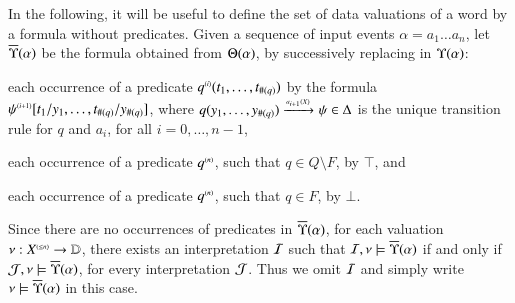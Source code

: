 \documentclass{llncs}
\begin{document}
In the following, it will be useful to define the set of data
valuations of a word by a formula without predicates. Given a sequence
of input events $\alpha = a_1 \ldots a_n$, let $\overline{\Upsilon}({\alpha})$ be
the formula obtained from $\Theta({\alpha})$, by successively
replacing in $\Upsilon({\alpha})$: \begin{compactenum}[(a)]
\item\label{it1:substform} each occurrence of a predicate
  ${q}^{\scriptscriptstyle{({i})}}(t_1,\ldots,t_{\#(q)})$ by the formula
  ${\psi}^{\scriptscriptstyle{({i+1})}}[t_1/y_1,\ldots,t_{\#(q)}/y_{\#(q)}]$, where
  $q(y_1,\ldots,y_{\#(q)}) \xrightarrow{{\scriptscriptstyle a_{i+1}(X)}}_{{\scriptstyle }} \psi \in \Delta$ is
  the unique transition rule for $q$ and $a_i$, for all
  $i=0,\ldots,n-1$,
%
\item\label{it2:substform} each occurrence of a predicate
  ${q}^{\scriptscriptstyle{({n})}}$, such that $q \in Q \setminus F$, by $\top$, and
%
\item\label{it3:substform} each occurrence of a predicate
  ${q}^{\scriptscriptstyle{({n})}}$, such that $q \in F$, by $\bot$.
\end{compactenum}
Since there are no occurrences of predicates in $\overline{\Upsilon}({\alpha})$,
for each valuation $\nu : {X}^{\scriptscriptstyle{({\leq n})}} \rightarrow \mathbb{D}$, there
exists an interpretation $\mathcal{I}$ such that $\mathcal{I},\nu \models
\overline{\Upsilon}({\alpha})$ if and only if $\mathcal{J},\nu \models \overline{\Upsilon}({\alpha})$, 
for every interpretation $\mathcal{J}$. Thus we omit $\mathcal{I}$ and simply write $\nu
\models \overline{\Upsilon}({\alpha})$ in this case.
\end{document}
